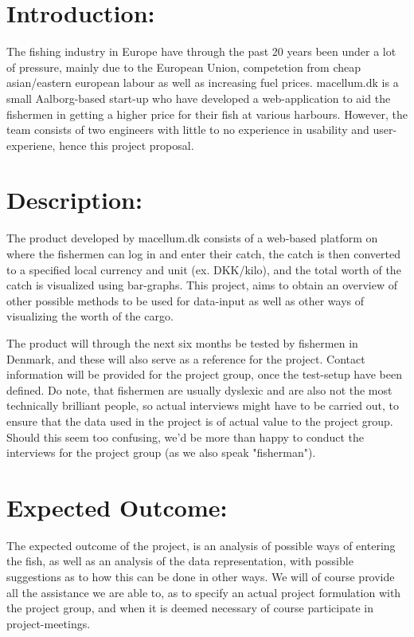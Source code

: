 \documentclass[10pt,stdletter,dateno,sigleft]{newlfm} %
\begin{document}
\begin{newlfm}


\section{Introduction:} The fishing industry in Europe have through the past 20 years been under a lot of pressure, mainly due to the European Union, competetion from cheap asian/eastern european labour as well as increasing fuel prices. macellum.dk is a small Aalborg-based start-up who have developed a web-application to aid the fishermen in getting a higher price for their fish at various harbours. However, the team consists of two engineers with little to no experience in usability and user-experiene, hence this project proposal.\\

\section{Description:} The product developed by macellum.dk consists of a web-based platform on where the fishermen can log in and enter their catch, the catch is then converted to a specified local currency and unit (ex. DKK/kilo), and the total worth of the catch is visualized using bar-graphs. This project, aims to obtain an overview of other possible methods to be used for data-input as well as other ways of visualizing the worth of the cargo.

The product will through the next six months be tested by fishermen in Denmark, and these will also serve as a reference for the project. Contact information will be provided for the project group, once the test-setup have been defined. Do note, that fishermen are usually dyslexic and are also not the most technically brilliant people, so actual interviews might have to be carried out, to ensure that the data used in the project is of actual value to the project group. Should this seem too confusing, we'd be more than happy to conduct the interviews for the project group (as we also speak "fisherman").\\
 
\section{Expected Outcome:} The expected outcome of the project, is an analysis of possible ways of entering the fish, as well as an analysis of the data representation, with possible suggestions as to how this can be done in other ways. We will of course provide all the assistance we are able to, as to specify an actual project formulation with the project group, and when it is deemed necessary of course participate in project-meetings.\\


\end{newlfm}
\end{document}

